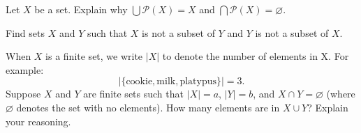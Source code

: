\documentclass[../notes.tex]{subfiles}
\begin{document}
\begin{homework}
    Let $X$ be a set. Explain why $\bigcup \mathcal P(X) = X$ and $\bigcap \mathcal P(X) = \varnothing$.
\end{homework}
\begin{homework}
    Find sets $X$ and $Y$ such that $X$ is not a subset of $Y$ and $Y$ is not a subset of $X$.
\end{homework}
\begin{homework}
    When $X$ is a finite set, we write $|X|$ to denote the number of elements in X. For example:
    \[|\{ \textrm{cookie}, \textrm{milk}, \textrm{platypus}\}| = 3.\]
    Suppose $X$ and $Y$ are finite sets such that $|X| = a$, $|Y| = b$, and $X \cap Y = \varnothing$ (where $\varnothing$ denotes the set with no elements). How many elements are in $X \cup Y$? Explain your reasoning.
\end{homework}
\end{document}
